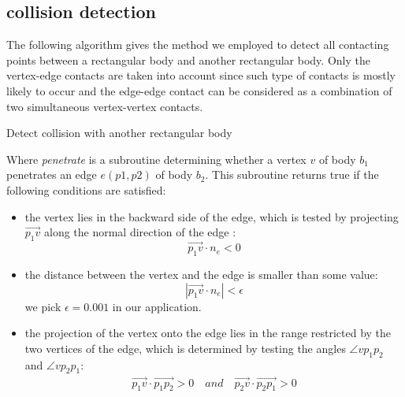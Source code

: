 \subsection{collision detection}
\label{sec:colli detect}
The following algorithm gives the method we employed to detect all contacting points between a rectangular body and another rectangular body. Only the vertex-edge contacts are taken into account since such type of contacts is mostly likely to occur and the edge-edge contact can be considered as a combination of two simultaneous vertex-vertex contacts.
\begin{algorithm}[htbp]
    \SetAlgoLined
    
    \caption{Detect collision with another rectangular body}\label{alg:mark}
\end{algorithm}
Where \emph{penetrate} is a subroutine determining whether a vertex $v$ of body $b_1$ penetrates an edge $e(p1,p2)$ of body $b_2$. This subroutine returns true if the following conditions are satisfied:
\begin{itemize}
    \item the vertex lies in the backward side of the edge, which is tested by projecting $\overrightarrow{p_1v}$ along the normal direction of the edge :
    \begin{equation*}
        \overrightarrow{p_1v} \cdot n_e<0
    \end{equation*}
    \item the distance between the vertex and the edge is smaller than some value:
    \begin{equation*}
        |\overrightarrow{p_1v}\cdot n_e| < \epsilon
    \end{equation*}
    we pick $\epsilon=0.001$ in our application.
    \item the projection of the vertex onto the edge lies in the range restricted by the two vertices of the edge, which is determined by testing the angles $\angle vp_1p_2$ and $\angle vp_2p_1$:
   \begin{gather*}
     \overrightarrow{p_1v} \cdot \overrightarrow{p_1p_2}>0 \quad and
     \quad \overrightarrow{p_2v} \cdot \overrightarrow{p_2p_1}>0
   \end{gather*}
\end{itemize}

